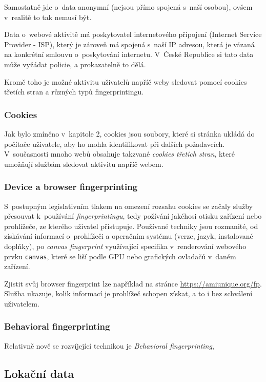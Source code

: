 Samostatně jde o~data anonymní (nejsou přímo spojená s~naší osobou), ovšem v~realitě to tak nemusí být.

Data o~webové aktivitě má poskytovatel internetového připojení (Internet Service Provider - ISP), který je zároveň má spojená s~naší IP adresou, která je vázaná na konkrétní smlouvu o~poskytování internetu. V~České Republice si tato data může vyžádat policie, a prokazatelně to dělá\citep{policie-isp}.

Kromě toho je možné aktivitu uživatelů napříč weby sledovat pomocí cookies třetích stran a různých typů fingerprintingu.
\subsubsection{Cookies}
Jak bylo zmíněno v~kapitole 2, cookies jsou soubory, které si stránka ukládá do počítače uživatele, aby ho mohla identifikovat při dalších požadavcích. V~současnosti mnoho webů obsahuje takzvané \textit{cookies třetích stran}, které umožňují službám sledovat aktivitu napříč webem.

\subsubsection{Device a browser fingerprinting}
S~postupným legislativním tlakem na omezení rozsahu cookies se začaly služby přesouvat k~používání \textit{fingerprintingu}, tedy požívání jakéhosi otisku zařízení nebo prohlížeče, ze kterého uživatel přistupuje. Používané techniky jsou rozmanité, od získávání informací o~prohlížeči a operačním systému (verze, jazyk, instalované doplňky), po \textit{canvas fingerprint} využívající specifika v~renderování webového prvku \verb|canvas|, které se liší podle GPU nebo grafických ovladačů v~daném zařízení.  

Zjistit svůj browser fingerprint lze například na stránce \url{https://amiunique.org/fp}. Služba ukazuje, kolik informací je prohlížeč schopen získat, a to i bez schválení uživatelem. 

\subsubsection{Behavioral fingerprinting}
Relativně nově se rozvíjející technikou je \textit{Behavioral fingerprinting}, 

\subsection{Lokační data}

